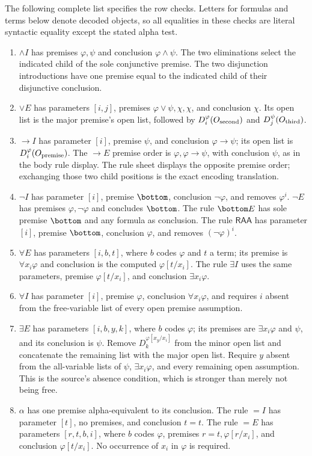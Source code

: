 The following complete list specifies the row checks.  Letters for formulas
and terms below denote decoded objects, so all equalities in these checks
are literal syntactic equality except the stated alpha test.
\begin{enumerate}
\item \(\land I\) has premises \(\varphi,\psi\) and conclusion
\(\varphi\land\psi\).  The two eliminations select the indicated child
of the sole conjunctive premise.  The two disjunction introductions have
one premise equal to the indicated child of their disjunctive conclusion.
\item \(\lor E\) has parameters \([i,j]\), premises
\(\varphi\lor\psi,\chi,\chi\), and conclusion \(\chi\).  Its open
list is the major premise's open list, followed by
\(D_i^\varphi(O_{\rm second})\) and \(D_j^\psi(O_{\rm third})\).
\item \(\to I\) has parameter \([i]\), premise \(\psi\), and
conclusion \(\varphi\to\psi\); its open list is
\(D_i^\varphi(O_{\rm premise})\).  The \(\to E\) premise order is
\(\varphi,\varphi\to\psi\), with conclusion \(\psi\), as in the
body rule display.  The rule sheet displays the opposite premise order;
exchanging those two child positions is the exact encoding translation.
\item \(\neg I\) has parameter \([i]\), premise \(\bottom\),
conclusion \(\neg\varphi\), and removes \(\varphi^i\).
\(\neg E\) has premises \(\varphi,\neg\varphi\) and concludes
\(\bottom\).  The rule \(\bottom E\) has sole premise \(\bottom\)
and any formula as conclusion.  The rule \(\mathsf{RAA}\) has parameter
\([i]\), premise \(\bottom\), conclusion \(\varphi\), and removes
\((\neg\varphi)^i\).
\item \(\forall E\) has parameters \([i,b,t]\), where \(b\) codes
\(\varphi\) and \(t\) a term; its premise is \(\forall x_i\varphi\)
and conclusion is the computed \(\varphi[t/x_i]\).  The rule
\(\exists I\) uses the same parameters, premise \(\varphi[t/x_i]\),
and conclusion \(\exists x_i\varphi\).
\item \(\forall I\) has parameter \([i]\), premise \(\varphi\),
conclusion \(\forall x_i\varphi\), and requires \(i\) absent from
the free-variable list of every open premise assumption.
\item \(\exists E\) has parameters \([i,b,y,k]\), where \(b\)
codes \(\varphi\); its premises are \(\exists x_i\varphi\) and
\(\psi\), and its conclusion is \(\psi\).  Remove
\(D_k^{\varphi[x_y/x_i]}\) from the minor open list and concatenate
the remaining list with the major open list.  Require \(y\) absent
from the all-variable lists of \(\psi\), \(\exists x_i\varphi\),
and every remaining open assumption.  This is the source's absence
condition, which is stronger than merely not being free.
\item \(\alpha\) has one premise alpha-equivalent to its conclusion.
The rule \(=I\) has parameter \([t]\), no premises, and conclusion
\(t=t\).  The rule \(=E\) has parameters \([r,t,b,i]\), where
\(b\) codes \(\varphi\), premises \(r=t,\varphi[r/x_i]\), and
conclusion \(\varphi[t/x_i]\).  No occurrence of \(x_i\) in
\(\varphi\) is required.
\end{enumerate}
